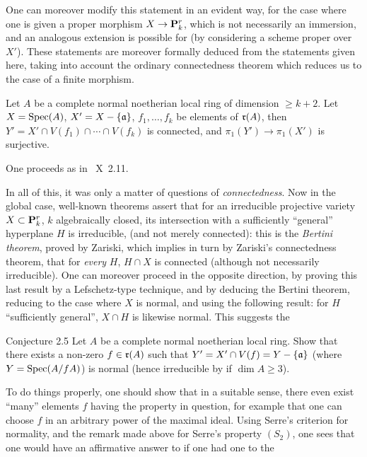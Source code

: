 One can moreover modify this statement in an
evident way, for the case where one is given a proper
morphism $X \to \PP^r_k$, which is not necessarily an
immersion, and an analogous extension is possible for
 (by considering a scheme proper over~$X'$). These
statements are moreover formally deduced from the statements given
here, taking into account the ordinary connectedness theorem which
reduces us to the case of a finite morphism.

\begin{corollary} \label{XIII.2.4}
Let $A$ be a complete normal noetherian local ring of dimension $\ge k+2$. Let $X=\operatorname{Spec} (A)$, $X'=X-\{ \mathfrak{a}\}$, $f_1, \dotsc, f_k$ be elements of $\mathfrak{r}(A)$, then $Y'=X'\cap V(f_1) \cap \dotsb \cap V(f_k)$ is connected, and $\pi_1(Y')\to \pi_1(X')$ is surjective.
\end{corollary}

One proceeds as in ~X~2.11.

In all of this, it was only a matter of questions of \emph{connectedness}. Now in the global case, well-known theorems assert that for an irreducible projective variety $X\subset {\mathbf P}^r_k$, $k$ algebraically closed, its intersection with a sufficiently ``general'' hyperplane $H$ is irreducible, (and not merely connected): this is the \emph{Bertini theorem}, proved by Zariski, which implies in turn by Zariski's connectedness theorem, that for \emph{every} $H$, $H\cap X$ is connected (although not necessarily irreducible). One can moreover proceed in the opposite direction, by proving this last result by a Lefschetz-type technique, and by deducing the Bertini theorem, reducing to the case where $X$ is normal, and using the following result: for $H$ ``sufficiently general'', $X\cap H$ is likewise normal. This suggests the

\label{XIII.2.5}
\begin{enonce*}{Conjecture 2.5\ndemark}
Let $A$ be a complete normal noetherian local ring. Show that there exists a non-zero $f\in\mathfrak{r}(A)$ such that $Y'=X'\cap V(f)=Y-\{ \mathfrak{a}\}$ (where $Y=\operatorname{Spec} (A/fA)$) is normal (hence irreducible by  if $\dim A\ge 3$).
\end{enonce*}

To do things properly, one should show that in a suitable sense, there even exist ``many'' elements $f$ having the property in question, for example that one can choose $f$ in an arbitrary power of the maximal ideal. Using Serre's criterion for normality, and the remark made above for Serre's property $(S_2)$, one sees that one would have an affirmative answer to  if one had one to the

